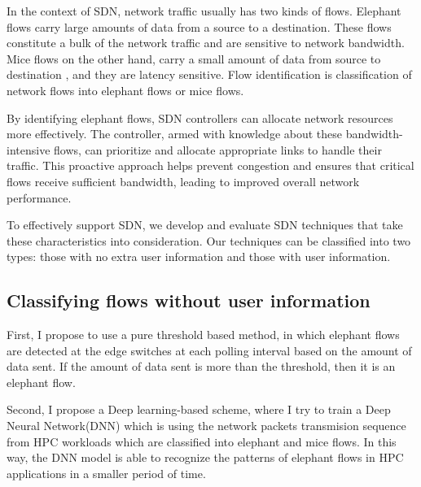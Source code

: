 
In the context of SDN, network traffic usually has two kinds of flows. Elephant flows 
carry large amounts of data from a source to a destination. These flows
constitute a bulk of the network traffic and are sensitive to network bandwidth.
Mice flows on the other hand, carry a small amount of data from source to
destination \cite{yang2020flow, afek2015sampling}, and they are latency sensitive. 
Flow identification is classification of network flows into elephant flows or mice flows.
\begin{comment}
For
applications I use, any flow that carries more than a certain threshold of data is an elephant flow, and any other is a
mice flow.
\end{comment}



By identifying elephant flows, SDN controllers can allocate network resources more 
effectively. The controller, armed with knowledge about these 
bandwidth-intensive flows, can prioritize and allocate appropriate 
links to handle their traffic. This proactive approach helps prevent 
congestion and ensures that critical flows receive sufficient bandwidth, 
leading to improved overall network performance.

To effectively support SDN, we develop and evaluate 
SDN techniques that take these characteristics into 
consideration. Our techniques can be classified into 
two types: those with no extra user information and those with user information.
\subsection{Classifying flows without user information}

First, I propose to use a pure threshold based method, in which elephant flows are 
detected at the edge switches at each polling interval based on 
the amount of data sent. If the amount of data sent is more than the threshold,
then it is an elephant flow. 
\begin{comment}
However, in the HPC environment, depending on applications, 
the time for each iteration may be much less than a second. 
Hence, these existing flow classification schemes will miss many 
iterations of application execution and are not effective for such HPC applications.
\end{comment}
Second, I propose a Deep learning-based scheme, where I try to train a Deep Neural Network(DNN)
which is using the network packets transmision sequence from HPC workloads which are classified
into elephant and mice flows. In this way,
the DNN model is able to recognize the patterns of elephant flows in HPC applications in a 
smaller period of time.


